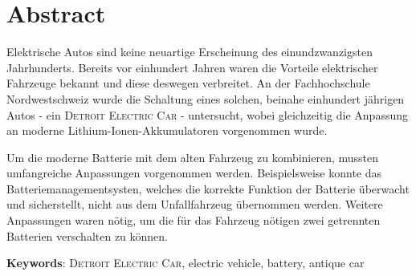\chapter*{Abstract}
Elektrische Autos sind keine neuartige Erscheinung des einundzwanzigsten Jahrhunderts. Bereits vor einhundert Jahren waren die Vorteile elektrischer Fahrzeuge bekannt und diese deswegen verbreitet. An der Fachhochschule Nordwestschweiz wurde die Schaltung eines solchen, beinahe einhundert jährigen Autos - ein \textsc{Detroit Electric Car} - untersucht, wobei gleichzeitig die Anpassung an moderne Lithium-Ionen-Akkumulatoren vorgenommen wurde.

Um die moderne Batterie mit dem alten Fahrzeug zu kombinieren, mussten umfangreiche Anpassungen vorgenommen werden. Beispielsweise konnte das Batteriemanagementsysten, welches die korrekte Funktion der Batterie überwacht und sicherstellt, nicht aus dem Unfallfahrzeug übernommen werden. Weitere Anpassungen waren nötig, um die für das Fahrzeug nötigen zwei getrennten Batterien verschalten zu können. 

\textbf{Keywords}: \textsc{Detroit Electric Car}, electric vehicle, battery, antique car